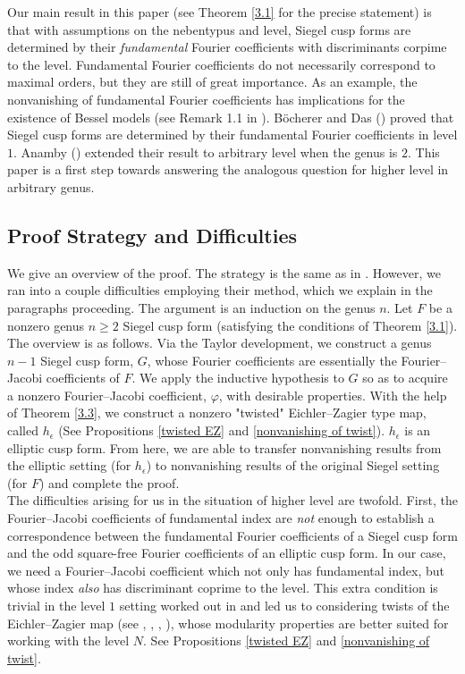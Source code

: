 \documentclass[11pt]{article}
\theoremstyle{definition}
\theoremstyle{remark}
\begin{document}
Our main result in this paper (see Theorem \ref{3.1} for the precise statement) is that with assumptions on the nebentypus and level, Siegel cusp forms are determined by their \textit{fundamental} Fourier coefficients with discriminants corpime to the level. Fundamental Fourier coefficients do not necessarily correspond to maximal orders, but they are still of great importance. As an example, the nonvanishing of fundamental Fourier coefficients has implications for the existence of Bessel models (see Remark 1.1 in \cite{Saha}). B\"ocherer and Das (\cite{BD}) proved that Siegel cusp forms are determined by their fundamental Fourier coefficients in level $1$. Anamby (\cite{anamby}) extended their result to arbitrary level when the genus is $2$. This paper is a first step towards answering the analogous question for higher level in arbitrary genus.  \\

\subsection{Proof Strategy and Difficulties}

We give an overview of the proof. The strategy is the same as in \cite{BD}. However, we ran into a couple difficulties employing their method, which we explain in the paragraphs proceeding. The argument is an induction on the genus $n$. Let $F$ be a nonzero genus $n \geq 2$ Siegel cusp form (satisfying the conditions of Theorem \ref{3.1}). The overview is as follows. Via the Taylor development, we construct a genus $n-1$ Siegel cusp form, $G$, whose Fourier coefficients are essentially the Fourier--Jacobi coefficients of $F$. We apply the inductive hypothesis to $G$ so as to acquire a nonzero Fourier--Jacobi coefficient, $\varphi$, with desirable properties. With the help of Theorem \ref{3.3}, we construct a nonzero "twisted" Eichler--Zagier type map, called $h_\epsilon$ (See Propositions \ref{twisted EZ} and \ref{nonvanishing of twist}). $h_\epsilon$ is an elliptic cusp form. From here, we are able to transfer nonvanishing results from the elliptic setting (for $h_\epsilon$) to nonvanishing results of the original Siegel setting (for $F$) and complete the proof. \\

The difficulties arising for us in the situation of higher level are twofold. First, the Fourier--Jacobi coefficients of fundamental index are \textit{not} enough to establish a correspondence between the fundamental Fourier coefficients of a Siegel cusp form and the odd square-free Fourier coefficients of an elliptic cusp form. In our case, we need a Fourier--Jacobi coefficient which not only has fundamental index, but whose index \textit{also} has discriminant coprime to the level. This extra condition is trivial in the level $1$ setting worked out in \cite{BD} and led us to considering twists of the Eichler--Zagier map (see \cite{das_anamby}, \cite{Saha}, \cite{EZ}, \cite{Skoruppa}), whose modularity properties are better suited for working with the level $N$. See Propositions \ref{twisted EZ} and \ref{nonvanishing of twist}. \\
\end{document}
